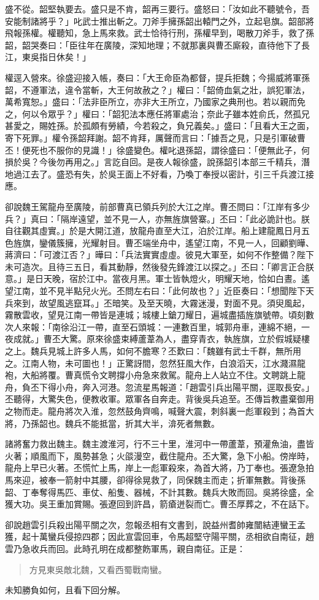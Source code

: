盛不從。韶堅執要去。盛只是不肯，韶再三要行。盛怒曰：「汝如此不聽號令，吾安能制諸將乎？」叱武士推出斬之。刀斧手擁孫韶出轅門之外，立起皂旗。韶部將飛報孫權。權聽知，急上馬來救。武士恰待行刑，孫權早到，喝散刀斧手，救了孫韶，韶哭奏曰：「臣往年在廣陵，深知地理；不就那裏與曹丕廝殺，直待他下了長江，東吳指日休矣！」

權逕入營來。徐盛迎接入帳，奏曰：「大王命臣為都督，提兵拒魏；今揚威將軍孫韶，不遵軍法，違令當斬，大王何故赦之？」權曰：「韶倚血氣之壯，誤犯軍法，萬希寬恕。」盛曰：「法非臣所立，亦非大王所立，乃國家之典刑也。若以親而免之，何以令眾乎？」權曰：「韶犯法本應任將軍處治；奈此子雖本姓俞氏，然孤兄甚愛之，賜姓孫。於孤頗有勞績，今若殺之，負兄義矣。」盛曰：「且看大王之面，寄下死罪。」權令孫韶拜謝。韶不肯拜，厲聲而言曰：「據吾之見，只是引軍破曹丕！便死也不服你的見識！」徐盛變色。權叱退孫韶，謂徐盛曰：「便無此子，何損於吳？今後勿再用之。」言訖自回。是夜人報徐盛，說孫韶引本部三千精兵，潛地過江去了。盛恐有失，於吳王面上不好看，乃喚丁奉授以密計，引三千兵渡江接應。

卻說魏王駕龍舟至廣陵，前部曹真已領兵列於大江之岸。曹丕問曰：「江岸有多少兵？」真曰：「隔岸遠望，並不見一人，亦無旌旗營寨。」丕曰：「此必詭計也。朕自往觀其虛實。」於是大開江道，放龍舟直至大江，泊於江岸。船上建龍鳳日月五色旌旗，鑾儀簇擁，光耀射目。曹丕端坐舟中，遙望江南，不見一人，回顧劉曄、蔣濟曰：「可渡江否？」曄曰：「兵法實實虛虛。彼見大軍至，如何不作整備？陛下未可造次。且待三五日，看其動靜，然後發先鋒渡江以探之。」丕曰：「卿言正合朕意。」是日天晚，宿於江中。當夜月黑。軍士皆執燈火，明耀天地，恰如白晝。遙望江南，並不見半點兒火光。丕問左右曰：「此何故也？」近臣奏曰：「想聞陛下天兵來到，故望風逃竄耳。」丕暗笑。及至天曉，大霧迷漫，對面不見。須臾風起，霧散雲收，望見江南一帶皆是連城；城樓上鎗刀耀日，遍城盡插旌旗號帶。頃刻數次人來報：「南徐沿江一帶，直至石頭城：一連數百里，城郭舟車，連綿不絕，一夜成就。」曹丕大驚。原來徐盛束縛蘆葦為人，盡穿青衣，執旌旗，立於假城疑樓之上。魏兵見城上許多人馬，如何不膽寒？丕歎曰：「魏雖有武士千群，無所用之。江南人物，未可圖也！」正驚訝間，忽然狂風大作，白浪滔天，江水濺濕龍袍，大船將覆。曹真慌令文聘撐小舟急來救駕。龍舟上人站立不住。文聘跳上龍舟，負丕下得小舟，奔入河港。忽流星馬報道：「趙雲引兵出陽平關，逕取長安。」丕聽得，大驚失色，便教收軍。眾軍各自奔走。背後吳兵追至。丕傳旨教盡棄御用之物而走。龍舟將次入淮，忽然鼓角齊鳴，喊聲大震，刺斜裏一彪軍殺到；為首大將，乃孫韶也。魏兵不能抵當，折其大半，渰死者無數。

諸將奮力救出魏主。魏主渡淮河，行不三十里，淮河中一帶蘆葦，預灌魚油，盡皆火著；順風而下，風勢甚急；火燄漫空，截住龍舟。丕大驚，急下小船。傍岸時，龍舟上早已火著。丕慌忙上馬，岸上一彪軍殺來，為首大將，乃丁奉也。張遼急拍馬來迎，被奉一箭射中其腰，卻得徐晃救了，同保魏主而走；折軍無數。背後孫韶、丁奉奪得馬匹、車仗、船隻、器械，不計其數。魏兵大敗而回。吳將徐盛，全獲大功。吳王重加賞賜。張遼回到許昌，箭瘡迸裂而亡。曹丕厚葬之，不在話下。

卻說趙雲引兵殺出陽平關之次，忽報丞相有文書到，說益州耆帥雍闓結連蠻王孟獲，起十萬蠻兵侵掠四郡；因此宣雲回車，令馬超堅守陽平關，丞相欲自南征，趙雲乃急收兵而回。此時孔明在成都整飭軍馬，親自南征。正是：

\begin{quote}
方見東吳敵北魏，又看西蜀戰南蠻。
\end{quote}

未知勝負如何，且看下回分解。
